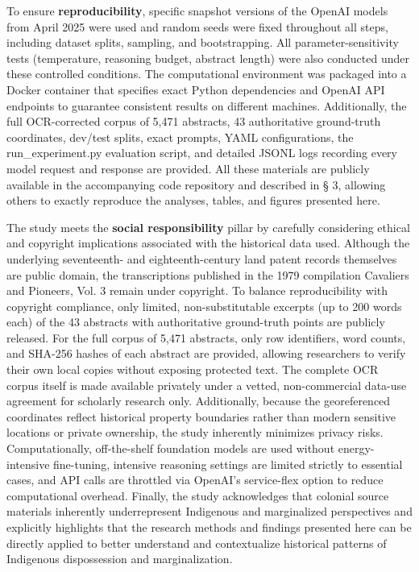 To ensure \textbf{reproducibility}, specific snapshot versions of the
OpenAI models from April 2025 were used and random seeds were fixed
throughout all steps, including dataset splits, sampling, and
bootstrapping. All parameter-sensitivity tests (temperature, reasoning
budget, abstract length) were also conducted under these controlled
conditions. The computational environment was packaged into a Docker
container that specifies exact Python dependencies and OpenAI API
endpoints to guarantee consistent results on different machines.
Additionally, the full OCR-corrected corpus of 5,471 abstracts, 43
authoritative ground-truth coordinates, dev/test splits, exact prompts,
YAML configurations, the run\_experiment.py evaluation script, and
detailed JSONL logs recording every model request and response are
provided. All these materials are publicly available in the accompanying
code repository and described in § 3, allowing others to exactly
reproduce the analyses, tables, and figures presented here.

The study meets the \textbf{social responsibility} pillar by carefully
considering ethical and copyright implications associated with the
historical data used. Although the underlying seventeenth- and
eighteenth-century land patent records themselves are public domain, the
transcriptions published in the 1979 compilation Cavaliers and Pioneers,
Vol. 3 remain under copyright. To balance reproducibility with copyright
compliance, only limited, non-substitutable excerpts (up to 200 words
each) of the 43 abstracts with authoritative ground-truth points are
publicly released. For the full corpus of 5,471 abstracts, only row
identifiers, word counts, and SHA-256 hashes of each abstract are
provided, allowing researchers to verify their own local copies without
exposing protected text. The complete OCR corpus itself is made
available privately under a vetted, non-commercial data-use agreement
for scholarly research only. Additionally, because the georeferenced
coordinates reflect historical property boundaries rather than modern
sensitive locations or private ownership, the study inherently minimizes
privacy risks. Computationally, off-the-shelf foundation models are used
without energy-intensive fine-tuning, intensive reasoning settings are
limited strictly to essential cases, and API calls are throttled via
OpenAI's service-flex option to reduce computational overhead. Finally,
the study acknowledges that colonial source materials inherently
underrepresent Indigenous and marginalized perspectives and explicitly
highlights that the research methods and findings presented here can be
directly applied to better understand and contextualize historical
patterns of Indigenous dispossession and marginalization.

